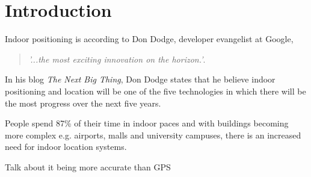 \chapter{Introduction}
Indoor positioning is according to Don Dodge, developer evangelist at Google, 
\begin{quotation}
	\textit{'...the most exciting innovation on the horizon.'}\cite{DonDNextBigThing}.
\end{quotation}

In his blog \textit{The Next Big Thing}, Don Dodge states that he believe indoor positioning and location will be one of the five technologies in which there will be the most progress over the next five years\cite{DonDIndoorIsNext}.

People spend 87\% of their time in indoor paces and with buildings becoming more complex e.g. airports, malls and university campuses, there is an increased need for indoor location systems.

Talk about it being more accurate than GPS
